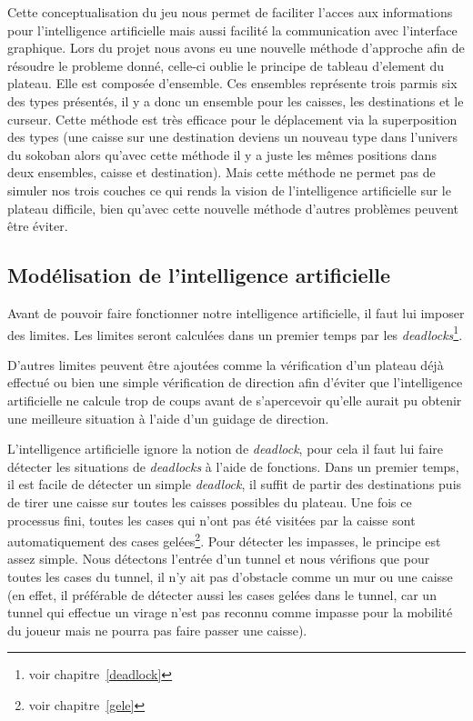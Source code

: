 \documentclass[a4paper, 11pt]{report}
\begin{document}
Cette conceptualisation du jeu nous permet de faciliter l'acces aux informations pour l'intelligence artificielle mais aussi facilité la communication avec l'interface graphique. Lors du projet nous avons eu une nouvelle méthode d'approche afin de résoudre le probleme donné, celle-ci oublie le principe de tableau d'element du plateau. Elle est composée d'ensemble. Ces ensembles représente trois parmis six des types présentés, il y a donc un ensemble pour les caisses, les destinations et le curseur. Cette méthode est très efficace pour le déplacement via la superposition des types (une caisse sur une destination deviens un nouveau type dans l'univers du sokoban alors qu'avec cette méthode il y a juste les mêmes positions dans deux ensembles, caisse et destination). Mais cette méthode ne permet pas de simuler nos trois couches ce qui rends la vision de l'intelligence artificielle sur le plateau difficile, bien qu'avec cette nouvelle méthode d'autres problèmes peuvent être éviter.

\subsection{Modélisation de l'intelligence artificielle}

\label{IA}


Avant de pouvoir faire fonctionner notre intelligence artificielle, il faut lui imposer des limites. Les limites seront calculées dans un premier temps par les \emph{deadlocks}\footnote{voir chapitre~\ref{deadlock}}.

D'autres limites peuvent être ajoutées comme la vérification d'un plateau déjà effectué ou bien une simple vérification de direction afin d'éviter que l'intelligence artificielle ne calcule trop de coups avant de s'apercevoir qu'elle aurait pu obtenir une meilleure situation à l'aide d'un guidage de direction.

L'intelligence artificielle ignore la notion de \emph{deadlock}, pour cela il faut lui faire détecter les situations de \emph{deadlocks} à l'aide de fonctions. Dans un premier temps, il est facile de détecter un simple \emph{deadlock}, il suffit de partir des destinations puis de tirer une caisse sur toutes les caisses possibles du plateau. Une fois ce processus fini, toutes les cases qui n'ont pas été visitées par la caisse sont automatiquement des cases gelées\footnote{voir chapitre~\ref{gele}}. Pour détecter les impasses, le principe est assez simple. Nous détectons l'entrée d'un tunnel et nous vérifions que pour toutes les cases du tunnel, il n'y ait pas d'obstacle comme un mur ou une caisse (en effet, il préférable de détecter aussi les cases gelées dans le tunnel, car un tunnel qui effectue un virage n'est pas reconnu comme impasse pour la mobilité du joueur mais ne pourra pas faire passer une caisse).
\end{document}
